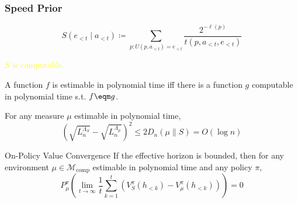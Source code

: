 \documentclass[UTF8,11pt,colorlinks,compress,openany]{beamer}%
\begin{document}
\begin{frame}\frametitle{Speed Prior}\vspace{-2ex}
\setlength\abovedisplayskip{0pt}
\setlength\belowdisplayskip{0pt}
	\[S(e_{<t}\mid a_{<t})\coloneqq \sum\limits_{p:U(p,a_{<t})=e_{<t}}\frac{2^{-\ell(p)}}{t(p,a_{<t},e_{<t})}\]
	\begin{center}
		\textcolor{yellow}{$S$ is computable.}
	\end{center}
	A function $f$ is estimable in polynomial time iff there is a function $g$ computable in polynomial time s.t. $f\eqm g$.
	\begin{block}{}
		For any measure $\mu$ estimable in polynomial time,
		\[
		\left(\sqrt{L_n^{\Lambda_S}}-\sqrt{L_n^{\Lambda_\mu}}\right)^2\leq 2D_n(\mu\|S)=O\left(\log n\right)
		\]\vspace{-1ex}
	\end{block}
	\begin{block}{On-Policy Value Convergence}
		If the effective horizon is bounded, then for any environment $\mu\in\mathcal{M}_{\mathrm{comp}}$ estimable in polynomial time and any policy $\pi$,
		\[P_\mu^\pi\left(\lim\limits_{t\to\infty}\frac{1}{t}\sum\limits_{k=1}^t\left(V_S^\pi(h_{<k})-V_\mu^\pi(h_{<k})\right)\right)=0\]\vspace{-1ex}
	\end{block}
\end{frame}
\end{document}
